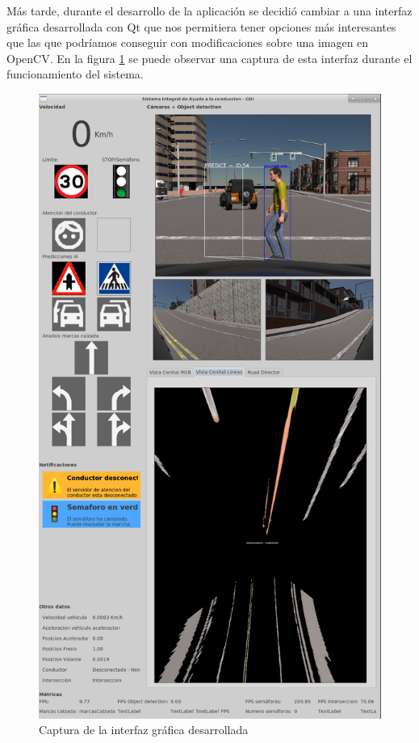 Más tarde, durante el desarrollo de la aplicación se decidió cambiar a una interfaz gráfica desarrollada con Qt que nos permitiera tener opciones más interesantes que las que podríamos conseguir con modificaciones sobre una imagen en OpenCV. En la figura \ref{fig:interfaz} se puede observar una captura de esta interfaz durante el funcionamiento del sistema.

\begin{figure}[h!]
    \centering
    \includegraphics[width=0.95\linewidth]{img/interfazJetson.png}
    \caption{Captura de la interfaz gráfica desarrollada}
    \label{fig:interfaz}    
\end{figure}

